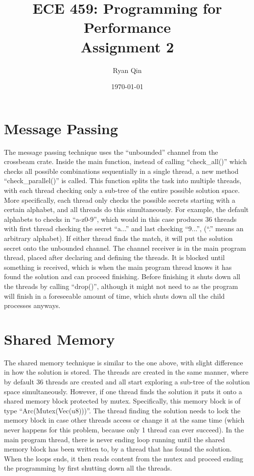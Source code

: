 \documentclass[12pt]{article}
\title{ECE 459: Programming for Performance\\Assignment 2}
\author{Ryan Qin}
\date{\today}
\begin{document}
\maketitle

\section{Message Passing}

    The message passing technique uses the ``unbounded'' channel from the crossbeam crate.
    Inside the main function, instead of calling ``check\_all()'' which checks all possible combinations sequentially in a single thread, a new method ``check\_parallel()'' is called.
    This function splits the task into multiple threads, with each thread checking only a sub-tree of the entire possible solution space.
    More specifically, each thread only checks the possible secrets starting with a certain alphabet, and all threads do this simultaneously.
    For example, the default alphabets to checks in ``a-z0-9'', which would in this case produces 36 threads with first thread checking the secret ``a...'' and last checking ``9...'', (``.'' means an arbitrary alphabet).
    If either thread finds the match, it will put the solution secret onto the unbounded channel.
    The channel receiver is in the main program thread, placed after declaring and defining the threads.
    It is blocked until something is received, which is when the main program thread knows it has found the solution and can proceed finishing.
    Before finishing it shuts down all the threads by calling ``drop()'', although it might not need to as the program will finish in a foreseeable amount of time, which shuts down all the child processes anyways.


\section{Shared Memory}

    The shared memory technique is similar to the one above, with slight difference in how the solution is stored.
    The threads are created in the same manner, where by default 36 threads are created and all start exploring a sub-tree of the solution space simultaneously.
    However, if one thread finds the solution it puts it onto a shared memory block protected by mutex.
    Specifically, this memory block is of type ``Arc(Mutex(Vec(u8)))''.
    The thread finding the solution needs to lock the memory block in case other threads access or change it at the same time (which never happens for this problem, because only 1 thread can ever succeed).
    In the main program thread, there is never ending loop running until the shared memory block has been written to, by a thread that has found the solution.
    When the loops ends, it then reads content from the mutex and proceed ending the programming by first shutting down all the threads.
\end{document}
